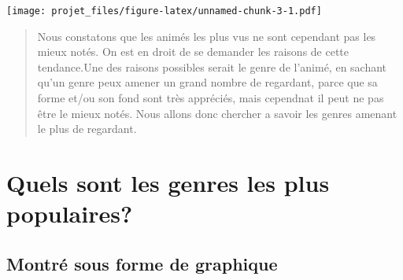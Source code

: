 \documentclass[]{article}
\newenvironment{Shaded}{\begin{snugshade}}{\end{snugshade}}
\newcommand{\DataTypeTok}[1]{\textcolor[rgb]{0.13,0.29,0.53}{#1}}
\newcommand{\DecValTok}[1]{\textcolor[rgb]{0.00,0.00,0.81}{#1}}
\newcommand{\KeywordTok}[1]{\textcolor[rgb]{0.13,0.29,0.53}{\textbf{#1}}}
\newcommand{\NormalTok}[1]{#1}
\newcommand{\OperatorTok}[1]{\textcolor[rgb]{0.81,0.36,0.00}{\textbf{#1}}}
\newcommand{\StringTok}[1]{\textcolor[rgb]{0.31,0.60,0.02}{#1}}
\begin{document}
\texttt{[image: projet\_files/figure-latex/unnamed-chunk-3-1.pdf]}

\begin{quote}
Nous constatons que les animés les plus vus ne sont cependant pas les
mieux notés. On est en droit de se demander les raisons de cette
tendance.Une des raisons possibles serait le genre de l'animé, en
sachant qu'un genre peux amener un grand nombre de regardant, parce que
sa forme et/ou son fond sont très appréciés, mais cependnat il peut ne
pas être le mieux notés. Nous allons donc chercher a savoir les genres
amenant le plus de regardant.
\end{quote}

\hypertarget{quels-sont-les-genres-les-plus-populaires}{%
\section{Quels sont les genres les plus
populaires?}\label{quels-sont-les-genres-les-plus-populaires}}

\hypertarget{montre-sous-forme-de-graphique-1}{%
\subsection{Montré sous forme de
graphique}\label{montre-sous-forme-de-graphique-1}}

\begin{Shaded}
\end{Shaded}
\end{document}

